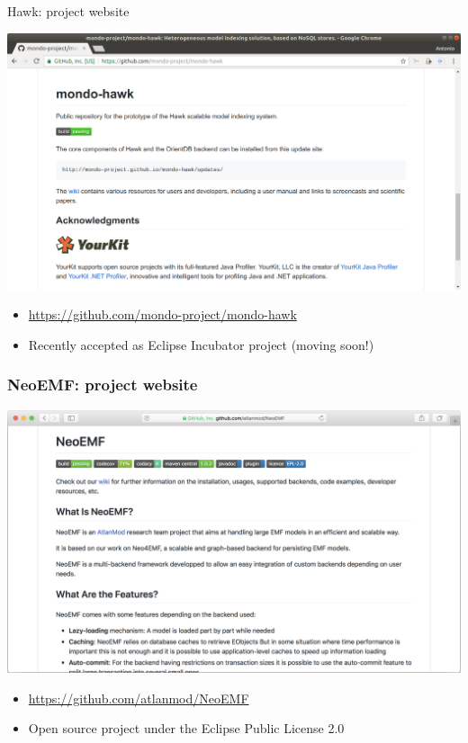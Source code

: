 \begin{frame}{Hawk: project website}
  \begin{center}
    \includegraphics[width=\textwidth]{../01-hawk/figures/hawk-github}
  \end{center}

  \begin{itemize}
  \item \url{https://github.com/mondo-project/mondo-hawk}
  \item Recently accepted as Eclipse Incubator project (moving soon!)
  \end{itemize}
\end{frame}

\begin{frame}\frametitle{NeoEMF: project website}
  \begin{center}
    \includegraphics[width=\textwidth]{../02-neoemf/figures/neoemf-github.png}
  \end{center}
	
  \begin{itemize}
  \item \url{https://github.com/atlanmod/NeoEMF}
  \item Open source project under the Eclipse Public License 2.0
  \end{itemize}
\end{frame}

